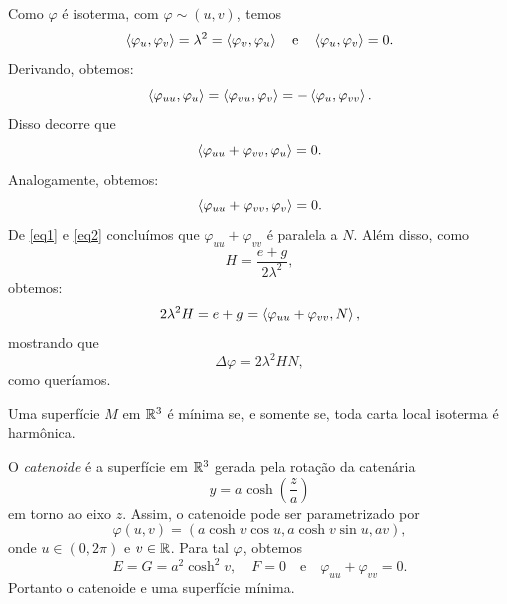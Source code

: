 \begin{demonstracao}
	Como $\varphi$ é isoterma, com $\varphi \sim (u, v)$, temos
	\begin{equation*}
	\left\langle \varphi_u,\varphi_v \right\rangle = \lambda^2 = \left\langle \varphi_v,\varphi_u \right\rangle \quad \text{e} \quad \left\langle \varphi_u,\varphi_v \right\rangle = 0.
	\end{equation*}
	Derivando, obtemos:
	\begin{equation*}
	\left\langle \varphi_{uu},\varphi_u \right\rangle = \left\langle \varphi_{vu},\varphi_v \right\rangle = - \left\langle \varphi_u,\varphi_{vv} \right\rangle.
	\end{equation*}
	Disso decorre que
	\begin{equation}\label{eq1}
	\left\langle \varphi_{uu} + \varphi_{vv},\varphi_u \right\rangle = 0.
	\end{equation}
	Analogamente, obtemos:
	\begin{equation}\label{eq2}
	\left\langle \varphi_{uu} + \varphi_{vv},\varphi_v \right\rangle = 0.
	\end{equation}
	De \eqref{eq1} e \eqref{eq2} concluímos que $\varphi_{uu} + \varphi_{vv}$ é paralela a $N$. Além disso, como
	\begin{equation}
	H = \frac{e+g}{2 \lambda^2},
	\end{equation}
	obtemos:
	\begin{equation*}
		2 \lambda^2 H = e + g = \left\langle \varphi_{uu} + \varphi_{vv},N \right\rangle,
	\end{equation*}
	mostrando que
	\begin{equation}
	\Delta \varphi = 2 \lambda^2 H N,
	\end{equation}
	como queríamos.
\end{demonstracao}

\begin{corolario}\label{equiv_isoterma_harmonica}
	Uma superfície $M$ em $\mathbb{R}^3$ é mínima se, e somente se, toda carta local isoterma é harmônica.
\end{corolario}

\begin{exemplo}
	O \emph{catenoide} é a superfície em $\mathbb{R}^3$ gerada pela rotação da catenária 
	\begin{equation*}
	y = a \cosh \left( \frac{z}{a} \right)
	\end{equation*}
	em torno ao eixo $z$.
	Assim, o catenoide pode ser parametrizado por
	\begin{equation*}
	\varphi(u,v) = \left( a \cosh v \cos u, a \cosh v \sin u, av \right),
	\end{equation*}
	onde $u \in (0, 2 \pi)$ e $v \in \mathbb{R}$. Para tal $\varphi$, obtemos
	\begin{equation*}
	E = G = a^2 \cosh^2 v, \quad F = 0 \quad \text{e} \quad \varphi_{uu} + \varphi_{vv} = 0.
	\end{equation*}
	Portanto o catenoide e uma superfície mínima.
\end{exemplo}

